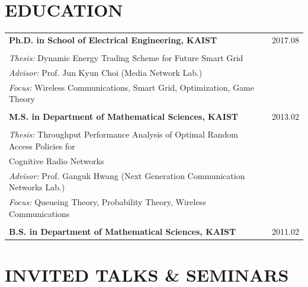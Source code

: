 \documentclass[11pt,a4paper]{article}
\begin{document}
\section{EDUCATION}

\begin{tabular}{p{14.5cm}r}
\textbf{Ph.D. in School of Electrical Engineering, KAIST} & 2017.08 \\
\\
\textit{Thesis:} Dynamic Energy Trading Scheme for Future Smart Grid & \\
\textit{Advisor:} Prof. Jun Kyun Choi (Media Network Lab.) & \\
\textit{Focus:} Wireless Communications, Smart Grid, Optimization, Game Theory& \\
\\
\textbf{M.S. in Department of Mathematical Sciences, KAIST} & 2013.02 \\
\\
\textit{Thesis:} Throughput Performance Analysis of Optimal Random Access Policies for & \\
Cognitive Radio Networks & \\
\textit{Advisor:} Prof. Ganguk Hwang (Next Generation Communication Networks Lab.) & \\
\textit{Focus:} Queueing Theory, Probability Theory, Wireless Communications & \\
\\
\textbf{B.S. in Department of Mathematical Sciences, KAIST} & 2011.02 \\
\end{tabular}

\section{INVITED TALKS \& SEMINARS}
\end{document}
